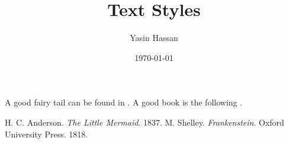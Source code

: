 \documentclass{article}
\title{ Text Styles}
\author{Yasin Hassan}
\date{\today}
\begin{document}
\maketitle

A good fairy tail can be found in \cite{Anderson}. A good book is the following \cite{Shelley}.

\cite{Shelley,Anderson}
\vspace{1cm}
\begin{thebibliography}{2}
H. C. Anderson. \textit{The Little Mermaid}. 1837.
M. Shelley. \textit{Frankenstein}. Oxford University Press. 1818.
\end{thebibliography}
\end{document}
